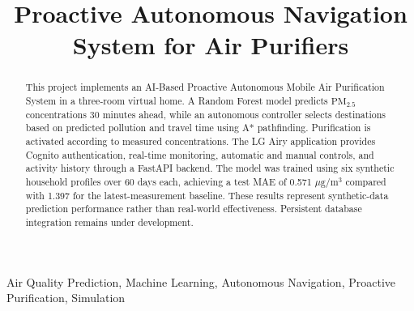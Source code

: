 \documentclass[conference]{IEEEtran}
\newcommand{\pmfine}{\ensuremath{\mathrm{PM}_{2.5}}}
\newcommand{\pmunit}{\ensuremath{\mu\mathrm{g}/\mathrm{m}^3}}
\begin{document}
\title{Proactive Autonomous Navigation System for Air Purifiers}
\author{
\and
{}
\and
{}
}
\maketitle

\begin{abstract}
This project implements an AI-Based Proactive Autonomous Mobile Air Purification System in a three-room virtual home. A Random Forest model predicts \pmfine{} concentrations 30 minutes ahead, while an autonomous controller selects destinations based on predicted pollution and travel time using A* pathfinding. Purification is activated according to measured concentrations. The LG Airy application provides Cognito authentication, real-time monitoring, automatic and manual controls, and activity history through a FastAPI backend. The model was trained using six synthetic household profiles over 60 days each, achieving a test MAE of 0.571 \pmunit{} compared with 1.397 for the latest-measurement baseline. These results represent synthetic-data prediction performance rather than real-world effectiveness. Persistent database integration remains under development.
\end{abstract}

\begin{IEEEkeywords}
Air Quality Prediction, Machine Learning, Autonomous Navigation, Proactive Purification, Simulation
\end{IEEEkeywords}
\end{document}
